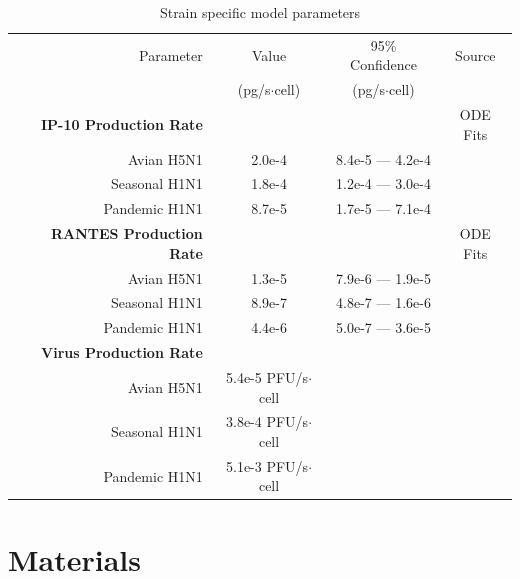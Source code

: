 \documentclass[10pt]{article}
\begin{document}
\begin{table}
\begin{center}
\begin{tabular}{ | r | c | c | c | }
  \hline                        
  Parameter & Value & 95\% Confidence & Source \\
   & \footnotesize{(pg/s$\cdot$cell)}  & \footnotesize{(pg/s$\cdot$cell)} &  \\
  \hline
  \textbf{IP-10 Production Rate} & & & ODE Fits \\
  Avian H5N1 & 2.0e-4 & \small{8.4e-5 --- 4.2e-4} & \\
  Seasonal H1N1 & 1.8e-4 & \small{1.2e-4 --- 3.0e-4} & \\
  Pandemic H1N1 & 8.7e-5 & \small{1.7e-5 --- 7.1e-4}  & \\
  \hline
  \textbf{RANTES Production Rate} & & & ODE Fits \\
  Avian H5N1 & 1.3e-5 & \small{7.9e-6 --- 1.9e-5} & \\
  Seasonal H1N1 & 8.9e-7 & \small{4.8e-7 --- 1.6e-6} & \\
  Pandemic H1N1 & 4.4e-6 & \small{5.0e-7 --- 3.6e-5} & \\
  \textbf{Virus Production Rate} & & & \cite{Mitchell2011} \\
  Avian H5N1 & 5.4e-5 PFU/s$\cdot$cell & & \\
  Seasonal H1N1 & 3.8e-4 PFU/s$\cdot$cell & & \\
  Pandemic H1N1 & 5.1e-3 PFU/s$\cdot$cell & & \\  
  \hline  
\end{tabular}
\caption{Strain specific model parameters}
\label{table:strains}
\end{center}
\end{table}

\section*{Materials}
\end{document}

